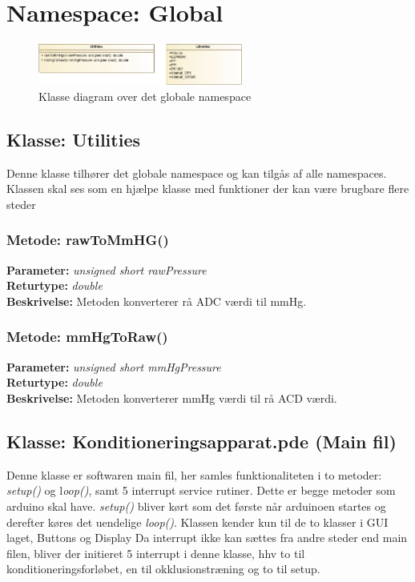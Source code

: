 \section{Namespace: Global}

\begin{figure}[H]
	\centering
	\includegraphics[width=0.6\textwidth]{klassediagram_extra-crop.pdf}
	\caption{Klasse diagram over det globale namespace}\label{fig:classDiagramextra}
\end{figure}

\subsection{Klasse: Utilities}
Denne klasse tilhører det globale namespace og kan tilgås af alle namespaces. Klassen skal ses som en hjælpe klasse med funktioner der kan være brugbare flere steder

\subsubsection{Metode: rawToMmHG()}
\textbf{Parameter: } \textit{unsigned short rawPressure}
\\ \textbf{Returtype: } \textit{double}
\\ \textbf{Beskrivelse: } Metoden konverterer rå ADC værdi til mmHg.

\subsubsection{Metode: mmHgToRaw()}
\textbf{Parameter: } \textit{unsigned short mmHgPressure}
\\ \textbf{Returtype: } \textit{double}
\\ \textbf{Beskrivelse: } Metoden konverterer mmHg værdi til rå ACD værdi.

\subsection{Klasse: Konditioneringsapparat.pde (Main fil)}
Denne klasse er softwaren main fil, her samles funktionaliteten i to metoder: \textit{setup()} og l\textit{oop()}, samt 5 interrupt service rutiner. Dette er begge metoder som arduino skal have. \textit{setup()} bliver kørt som det første når arduinoen startes og derefter køres det uendelige \textit{loop()}. Klassen kender kun til de to klasser i GUI laget, Buttons og Display
Da interrupt ikke kan sættes fra andre steder end main filen, bliver der initieret 5 interrupt i denne klasse, hhv to til konditioneringsforløbet, en til okklusionstræning og to til setup.

